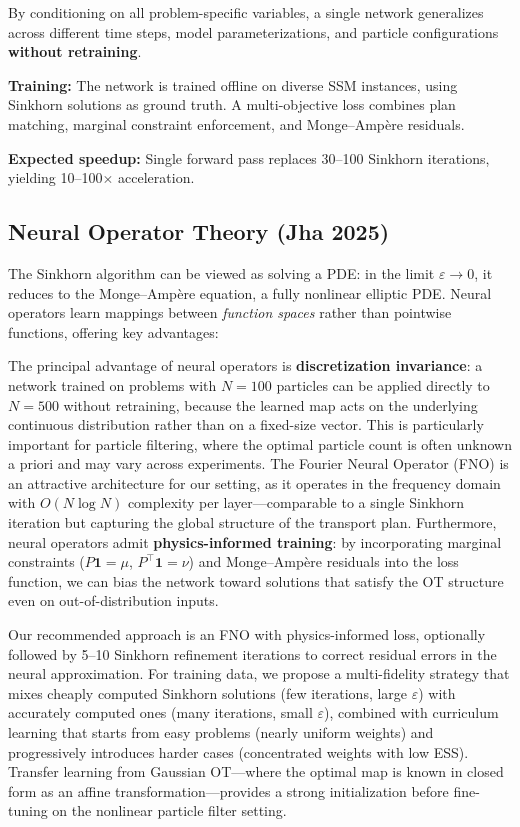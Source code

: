 \documentclass[12pt,a4paper]{article}
\theoremstyle{definition}
\theoremstyle{remark}
\begin{document}
By conditioning on all problem-specific variables, a single network generalizes across different time steps, model parameterizations, and particle configurations \textbf{without retraining}.

\textbf{Training:} The network is trained offline on diverse SSM instances, using Sinkhorn solutions as ground truth. A multi-objective loss combines plan matching, marginal constraint enforcement, and Monge--Amp\`ere residuals.

\textbf{Expected speedup:} Single forward pass replaces 30--100 Sinkhorn iterations, yielding 10--100$\times$ acceleration.

\subsection{Neural Operator Theory (Jha 2025)}

The Sinkhorn algorithm can be viewed as solving a PDE: in the limit $\varepsilon \to 0$, it reduces to the Monge--Amp\`ere equation, a fully nonlinear elliptic PDE. Neural operators \citep{jha2025} learn mappings between \textit{function spaces} rather than pointwise functions, offering key advantages:

The principal advantage of neural operators is \textbf{discretization invariance}: a network trained on problems with $N = 100$ particles can be applied directly to $N = 500$ without retraining, because the learned map acts on the underlying continuous distribution rather than on a fixed-size vector. This is particularly important for particle filtering, where the optimal particle count is often unknown a priori and may vary across experiments. The Fourier Neural Operator (FNO) is an attractive architecture for our setting, as it operates in the frequency domain with $O(N \log N)$ complexity per layer---comparable to a single Sinkhorn iteration but capturing the global structure of the transport plan. Furthermore, neural operators admit \textbf{physics-informed training}: by incorporating marginal constraints ($P \mathbf{1} = \mu$, $P^\top \mathbf{1} = \nu$) and Monge--Amp\`ere residuals into the loss function, we can bias the network toward solutions that satisfy the OT structure even on out-of-distribution inputs.

Our recommended approach is an FNO with physics-informed loss, optionally followed by 5--10 Sinkhorn refinement iterations to correct residual errors in the neural approximation. For training data, we propose a multi-fidelity strategy that mixes cheaply computed Sinkhorn solutions (few iterations, large $\varepsilon$) with accurately computed ones (many iterations, small $\varepsilon$), combined with curriculum learning that starts from easy problems (nearly uniform weights) and progressively introduces harder cases (concentrated weights with low ESS). Transfer learning from Gaussian OT---where the optimal map is known in closed form as an affine transformation---provides a strong initialization before fine-tuning on the nonlinear particle filter setting.
\end{document}
